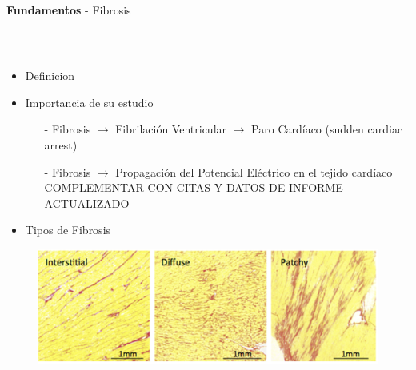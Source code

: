 \documentclass[11pt]{beamer}
\begin{document}
	\begin{frame}[t]
		\vspace*{0.5 cm} \textbf{Fundamentos} - Fibrosis
		\color{brown}\rule{\linewidth}{4pt} \\ [0.2 cm]
		\begin{itemize}
			\item Definicion
			\item Importancia de su estudio
			\begin{itemize}
				\item[-] Fibrosis  $\rightarrow$ Fibrilación Ventricular $\rightarrow$ Paro Cardíaco (sudden cardiac arrest)
				\item[-] Fibrosis $\rightarrow$ Propagación del Potencial Eléctrico en el tejido cardíaco \cite{TenTusscher2007Europace}
				COMPLEMENTAR CON CITAS Y DATOS DE INFORME ACTUALIZADO
			\end{itemize}
			\item Tipos de Fibrosis
		\end{itemize}
		
		\begin{figure}
			\centering
			\includegraphics[width= 10 cm]{fig/tipos_de_fibrosis}
		\end{figure}
	\end{frame}
\end{document}
